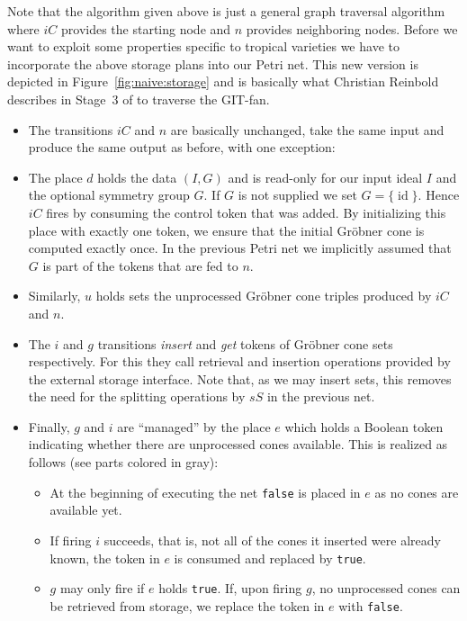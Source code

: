 \documentclass[
  paper=a4,
  titlepage,
  bibliography=totoc,
  listof=totoc,
  pagesize=pdftex
]{scrartcl}
\numberwithin{figure}{section}
\numberwithin{equation}{section}
\numberwithin{table}{section}
\DeclareMathOperator{\id}{id}
\theoremstyle{definition}
\numberwithin{definition}{section}
\begin{document}
Note that the algorithm given above is just a general graph traversal algorithm where $iC$
provides the starting node and $n$ provides neighboring nodes. Before we want to exploit
some properties specific to tropical varieties we have to incorporate the above storage
plans into our Petri net. This new version is depicted in Figure~\ref{fig:naive:storage}
and is basically what Christian Reinbold describes in Stage~3 of
\cite[Section~4.4]{reinboldGitFan} to traverse the GIT-fan.
\begin{itemize}
  \item The transitions $iC$ and $n$ are basically unchanged, take the same input and
    produce the same output as before, with one exception:
  \item The place $d$ holds the data $(I, G)$ and is read-only for our input ideal $I$ and
    the optional symmetry group $G$. If $G$ is not supplied we set $G=\{\id\}$. Hence $iC$
    fires by consuming the control token that was added. By initializing this place with
    exactly one token, we ensure that the initial Gröbner cone is computed exactly once.
    In the previous Petri net we implicitly assumed that $G$ is part of the tokens that
    are fed to $n$.
  \item Similarly, $u$ holds sets the unprocessed Gröbner cone triples produced by $iC$
    and $n$.
  \item The $i$ and $g$ transitions \emph{insert} and \emph{get} tokens of Gröbner cone
    sets respectively. For this they call retrieval and insertion operations provided by
    the external storage interface. Note that, as we may insert sets, this removes the
    need for the splitting operations by $sS$ in the previous net.
  \item Finally, $g$ and $i$ are \enquote{managed} by the place $e$ which holds a Boolean
    token indicating whether there are unprocessed cones available. This is realized as
    follows (see parts colored in gray):
    \begin{itemize}
      \item At the beginning of executing the net \texttt{false} is placed in $e$ as no
        cones are available yet.
      \item If firing $i$ succeeds, that is, not all of the cones it inserted were already
        known, the token in $e$ is consumed and replaced by \texttt{true}.
      \item $g$ may only fire if $e$ holds \texttt{true}. If, upon firing $g$, no
        unprocessed cones can be retrieved from storage, we replace the token in $e$ with
        \texttt{false}.
    \end{itemize}
\end{itemize}
\end{document}
